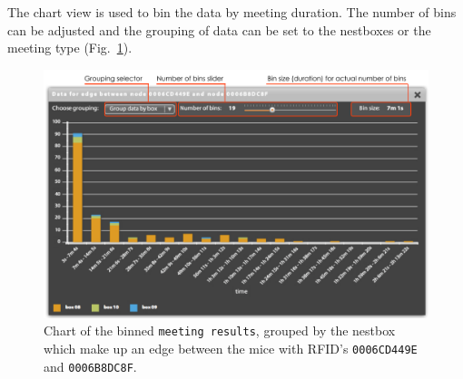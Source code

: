 The chart view is used to bin the data by meeting duration. The number of bins can be adjusted and the grouping of data can be set to the nestboxes or the meeting type (Fig.~\ref{fig:edge_data_panel_chart}).

\begin{figure}[!htpb]
\begin{center}
  \includegraphics[width=.95\textwidth]{assets/pdf/edge_data_panel_chart.pdf}
  \caption[Edge data chart]{Chart of the binned \lstinline|meeting results|, grouped by the nestbox which make up an edge between the mice with RFID's \lstinline|0006CD449E| and \lstinline|0006B8DC8F|.}
  \label{fig:edge_data_panel_chart}
\end{center}
\end{figure}   
